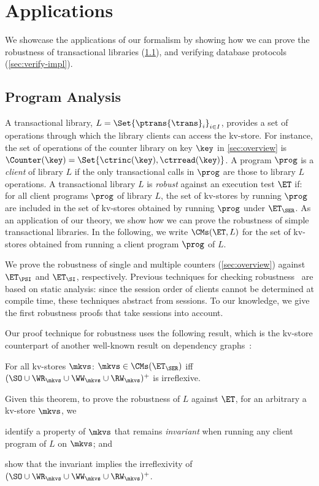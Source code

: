 \section{Applications}
\label{sec:applications}

We showcase the applications of our formalism by showing how we can prove the robustness of transactional libraries (\cref{sec:program-analysis}), and verifying database protocols
 (\cref{sec:verify-impl}).

\subsection{Program Analysis}
\label{sec:program-analysis}
A transactional library, $L = \Set{\ptrans{\trans}_{i}}_{i \in I}$, 
provides a set of operations through which the library clients can access the kv-store. 
For instance, the set of operations of the counter library on key $\key$ in \cref{sec:overview} is $\Counter(\key) = \Set{\ctrinc(\key), \ctrread(\key)}$.
A program $\prog$ is a \emph{client} of library $L$ if the only transactional calls in $\prog$ are those to library $L$ operations.  
A transactional library $L$ is \emph{robust} against an execution test $\ET$ if: 
for all client programs $\prog$ of library $L$, the set of kv-stores by running $\prog$ are included in the set of kv-stores obtained by running $\prog$ under $\ET_{\SER}$.
As an application of our theory, we show how we can prove the robustness of simple transactional libraries. 
In the following, we write $\CMs(\ET, L)$ for the set of kv-stores obtained from running a client program $\prog$ of $L$. 

We prove the robustness of single and multiple counters (\cref{sec:overview}) against $\ET_{\PSI}$ and $\ET_{\SI}$, respectively.
Previous techniques for checking robustness~\cite{giovanni_concur16,SIanalysis,laws,sureshConcur} 
are based on static analysis: since the session order of clients cannot be determined at compile 
time, these techniques abstract from sessions. 
To our knowledge, we give the first robustness proofs that take sessions into account.

Our proof technique for robustness uses the following result, which is the kv-store counterpart of another well-known result on dependency graphs~\cite{adya}:
\begin{theorem}
\label{thm:serialisable_nocycle}
For all kv-stores $\mkvs$: $\mkvs \in \CMs(\ET_{\SER})$ iff $(\SO \cup \WR_{\mkvs} 
\cup \WW_{\mkvs} \cup \RW_{\mkvs})^{+}$ is irreflexive.
\end{theorem}
Given this theorem, to prove the robustness of $L$ against $\ET$, 
for an arbitrary a kv-store $\mkvs$, we 
\begin{enumerate*}
	\item identify a property of $\mkvs$ that remains \emph{invariant} when running any client program of $L$ on $\mkvs$; and 
	\item show that the invariant implies the irreflexivity of $(\SO \cup \WR_{\mkvs} \cup \WW_{\mkvs} \cup \RW_{\mkvs})^{+}$.
\end{enumerate*}

